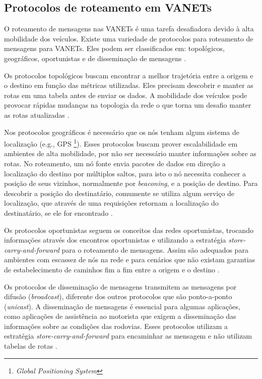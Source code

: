 \documentclass[mestrado, pre-defesa, english, brazil]{packages/icmc}
\begin{document}
\subsection{Protocolos de roteamento em VANETs} \label{algo_rot_vanets}

O roteamento de mensagens nas VANETs é uma tarefa desafiadora devido à alta mobilidade dos veículos.
Existe uma variedade de protocolos para roteamento de mensagens para VANETs. Eles podem ser classificados em: topológicos, geográficos, oportunistas e de disseminação de mensagens \cite{Alves-2009}.

Os protocolos topológicos buscam encontrar a melhor trajetória entre a origem e o destino em função das métricas utilizadas. Eles precisam descobrir e manter as rotas em uma tabela antes de enviar os dados.  A mobilidade dos veículos pode provocar rápidas mudanças na topologia da rede o que torna um desafio manter as rotas atualizadas \cite{sa-2012}.

Nos protocolos geográficos é necessário que os nós tenham algum sistema de localização (e.g., GPS \footnote{\textit{Global Positioning System}}). Esses protocolos buscam prover escalabilidade em ambientes de alta mobilidade, por não ser necessário manter informações sobre as rotas. No roteamento, um nó fonte envia pacotes de dados em direção a localização do destino por múltiplos saltos, para isto o nó necessita conhecer a posição de seus vizinhos, normalmente por \textit{beaconing}, e a posição de destino. Para descobrir a posição do destinatário, comumente se utiliza algum serviço de localização, que através de uma requisições retornam a localização do destinatário, se ele for encontrado \cite{Alves-2009}.

Os protocolos oportunistas seguem os conceitos das redes oportunistas, trocando informações através dos encontros oportunistas e utilizando a estratégia \textit{store-carry-and-forward} para o roteamento de mensagens. Assim são adequados para ambientes com escassez de nós na rede e para cenários que não existam garantias de estabelecimento de caminhos fim a fim entre a origem e o destino \cite{oliveira-2010}.

Os protocolos de disseminação de mensagens transmitem as mensagens por difusão (\textit{broadcast}), diferente dos outros protocolos que são ponto-a-ponto (\textit{unicast}). A disseminação de mensagens é essencial para algumas aplicações, como aplicações de assistência ao motorista que exigem a disseminação das informações sobre as condições das rodovias. Esses protocolos utilizam a estratégia \textit{store-carry-and-forward} para encaminhar as mensagem e não utilizam tabelas de rotas \cite{Alves-2009}.
\end{document}
